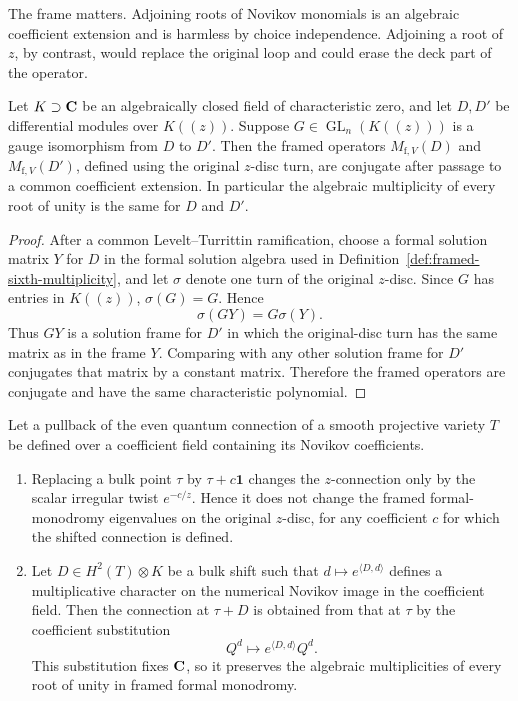The frame matters.  Adjoining roots of Novikov monomials is an algebraic
coefficient extension and is harmless by choice independence.  Adjoining a root of
\(z\), by contrast, would replace the original loop and could erase the deck
part of the operator.

\begin{lemmaOneA}
\label{lem:frame-transport}
Let \(K\supset\mathbf C\) be an algebraically closed field of characteristic zero,
and let \(D,D'\) be differential modules over \(K(\!(z)\!)\).  Suppose
\(G\in\operatorname{GL}_n(K(\!(z)\!))\) is a gauge isomorphism from \(D\) to
\(D'\).  Then the framed operators \(M_{\mathrm f,V}(D)\) and
\(M_{\mathrm f,V}(D')\), defined using the original \(z\)-disc turn, are
conjugate after passage to a common coefficient extension.  In particular the
algebraic multiplicity of every root of unity is the same for \(D\) and
\(D'\).
\end{lemmaOneA}

\begin{proof}
After a common Levelt--Turrittin ramification, choose a formal solution matrix
\(Y\) for \(D\) in the formal solution algebra used in
Definition~\ref{def:framed-sixth-multiplicity}, and let \(\sigma\) denote one
turn of the original \(z\)-disc.  Since \(G\) has entries in
\(K(\!(z)\!)\), \(\sigma(G)=G\).  Hence
\[
 \sigma(GY)=G\sigma(Y).
\]
Thus \(GY\) is a solution frame for \(D'\) in which the original-disc turn has
the same matrix as in the frame \(Y\).  Comparing with any other solution frame
for \(D'\) conjugates that matrix by a constant matrix.  Therefore the framed
operators are conjugate and have the same characteristic polynomial.
\end{proof}

\begin{lemma}
\label{lem:exact-low-degree-shifts}
%
%
%
Let a pullback of the even quantum connection of a smooth projective
variety $T$ be defined over a coefficient field containing its Novikov
coefficients.
\begin{enumerate}[label=(\roman*)]
\item Replacing a bulk point $\tau$ by $\tau+c\mathbf 1$ changes the
$z$-connection only by the scalar irregular twist $e^{-c/z}$.  Hence it does
not change the framed formal-monodromy eigenvalues on the original
$z$-disc, for any coefficient $c$ for which the shifted connection is
defined.
\item Let $D\in H^2(T)\otimes K$ be a bulk shift such that
$d\mapsto e^{\langle D,d\rangle}$ defines a multiplicative character on
the numerical Novikov image in the coefficient field.  Then the connection
at $\tau+D$ is obtained from that at $\tau$ by the coefficient
substitution
\[
 Q^d\longmapsto e^{\langle D,d\rangle}Q^d.
\]
This substitution fixes $\mathbf C$, so it preserves the algebraic
multiplicities of every root of unity in framed formal monodromy.
\end{enumerate}
\end{lemma}

